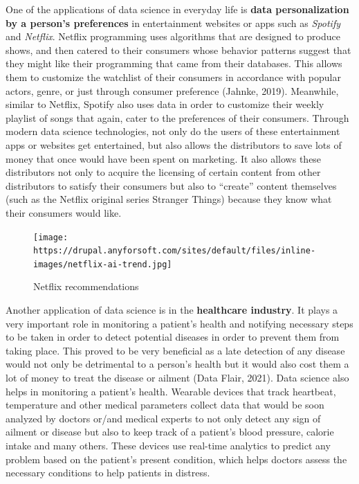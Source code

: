 \documentclass[
]{article}
\begin{document}
One of the applications of data science in everyday life is \textbf{data
personalization by a person's preferences} in entertainment websites or
apps such as \emph{Spotify} and \emph{Netflix}. Netflix programming uses
algorithms that are designed to produce shows, and then catered to their
consumers whose behavior patterns suggest that they might like their
programming that came from their databases. This allows them to
customize the watchlist of their consumers in accordance with popular
actors, genre, or just through consumer preference (Jahnke, 2019).
Meanwhile, similar to Netflix, Spotify also uses data in order to
customize their weekly playlist of songs that again, cater to the
preferences of their consumers. Through modern data science
technologies, not only do the users of these entertainment apps or
websites get entertained, but also allows the distributors to save lots
of money that once would have been spent on marketing. It also allows
these distributors not only to acquire the licensing of certain content
from other distributors to satisfy their consumers but also to
``create'' content themselves (such as the Netflix original series
Stranger Things) because they know what their consumers would like.

\begin{figure}
\centering
\texttt{[image: https://drupal.anyforsoft.com/sites/default/files/inline-images/netflix-ai-trend.jpg]}
\caption{Netflix recommendations}
\end{figure}

Another application of data science is in the \textbf{healthcare
industry}. It plays a very important role in monitoring a patient's
health and notifying necessary steps to be taken in order to detect
potential diseases in order to prevent them from taking place. This
proved to be very beneficial as a late detection of any disease would
not only be detrimental to a person's health but it would also cost them
a lot of money to treat the disease or ailment (Data Flair, 2021). Data
science also helps in monitoring a patient's health. Wearable devices
that track heartbeat, temperature and other medical parameters collect
data that would be soon analyzed by doctors or/and medical experts to
not only detect any sign of ailment or disease but also to keep track of
a patient's blood pressure, calorie intake and many others. These
devices use real-time analytics to predict any problem based on the
patient's present condition, which helps doctors assess the necessary
conditions to help patients in distress.
\end{document}

